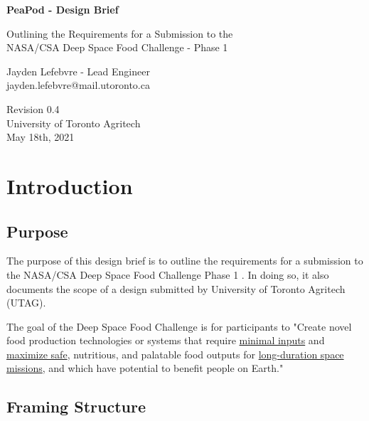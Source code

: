 \documentclass{report}
\begin{document}
\begin{titlepage}
    \begin{center}
        \vspace*{1.2cm}
        
        \textbf{\large{PeaPod - Design Brief}}
        
        \vspace{0.5cm}
        Outlining the Requirements for a Submission to the \\NASA/CSA Deep Space Food Challenge - Phase 1

        \vfill
        
        Jayden Lefebvre - Lead Engineer\\\small{jayden.lefebvre@mail.utoronto.ca}
        
        \vspace{2.5cm}
        
        Revision 0.4\\
        University of Toronto Agritech\\
        May 18th, 2021
        
    \end{center}
 \end{titlepage}

\thispagestyle{plain}

\tableofcontents
\newpage

\section{Introduction}
\label{sec:intro}

\subsection{Purpose}
\label{sec:purpose}

The purpose of this design brief is to outline the requirements for a submission 
to the NASA/CSA Deep Space Food Challenge Phase 1 \cite{dsfc}. In doing so, it also
documents the scope of a design submitted by University of Toronto Agritech (UTAG).

The goal of the Deep Space Food Challenge is for participants to "Create novel 
food production technologies or systems that require \uline{minimal inputs} and \uline{maximize safe}, nutritious, and palatable food outputs for 
\uline{long-duration space missions}, and which have potential to benefit 
people on Earth." \cite{applicantguide}

\subsection{Framing Structure}
\label{sec:structure}
\end{document}
